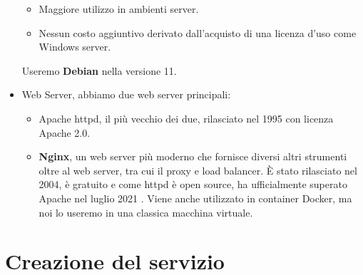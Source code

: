 \begin{itemize}
\begin{itemize}
        \item Maggiore utilizzo in ambienti server.
        \item Nessun costo aggiuntivo derivato dall'acquisto di una licenza d'uso come Windows server.
    \end{itemize}
    Useremo \textbf{Debian} nella versione 11.
    \item Web Server, abbiamo due web server principali:
    \begin{itemize}
        \item Apache httpd, il più vecchio dei due, rilasciato nel 1995 con licenza Apache 2.0.
        \item \textbf{Nginx}, un web server più moderno che fornisce diversi altri strumenti oltre al web server, tra cui il proxy e load balancer. È stato rilasciato nel 2004, è gratuito e come httpd è open source, ha ufficialmente superato Apache nel luglio 2021 \cite{WebServerHistory}. Viene anche utilizzato in container Docker, ma noi lo useremo in una classica macchina virtuale.
    \end{itemize}
\end{itemize}

\newpage
\section{Creazione del servizio}

